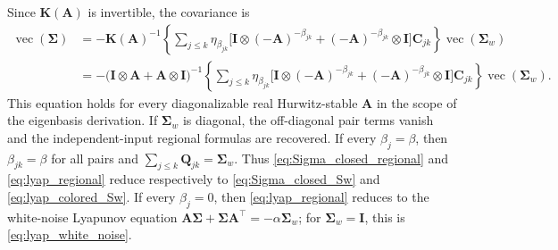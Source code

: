 \documentclass[12pt]{article}
\newcommand{\vc}{\operatorname{vec}}
\begin{document}
Since $\mathbf K(\mathbf A)$ is invertible, the covariance is
\begin{equation}
\boxed{\begin{aligned}
\vc(\boldsymbol\Sigma)
&=-\mathbf K(\mathbf A)^{-1}
\left\{
\sum_{j\leq k}\eta_{\beta_{jk}}
\bigl[\mathbf I\otimes(-\mathbf A)^{-\beta_{jk}}
+(-\mathbf A)^{-\beta_{jk}}\otimes\mathbf I\bigr]\mathbf C_{jk}
\right\}
\vc(\boldsymbol\Sigma_w)\\
&=-\bigl(\mathbf I\otimes\mathbf A
+\mathbf A\otimes\mathbf I\bigr)^{-1}
\left\{
\sum_{j\leq k}\eta_{\beta_{jk}}
\bigl[\mathbf I\otimes(-\mathbf A)^{-\beta_{jk}}
+(-\mathbf A)^{-\beta_{jk}}\otimes\mathbf I\bigr]\mathbf C_{jk}
\right\}
\vc(\boldsymbol\Sigma_w).
\end{aligned}}
\label{eq:vec_regional_solution}
\end{equation}
This equation holds for every diagonalizable real Hurwitz-stable $\mathbf A$ in the scope of the eigenbasis derivation.
If $\boldsymbol\Sigma_w$ is diagonal, the off-diagonal pair terms vanish and the independent-input regional
formulas are recovered. If every $\beta_j=\beta$, then $\beta_{jk}=\beta$ for all pairs and
$\sum_{j\leq k}\mathbf Q_{jk}=\boldsymbol{\Sigma}_w$. Thus
\eqref{eq:Sigma_closed_regional} and \eqref{eq:lyap_regional} reduce respectively to
\eqref{eq:Sigma_closed_Sw} and \eqref{eq:lyap_colored_Sw}. If every $\beta_j=0$, then
\eqref{eq:lyap_regional} reduces to the white-noise Lyapunov equation
$\mathbf A\boldsymbol{\Sigma}+\boldsymbol{\Sigma}\mathbf A^\top=-\alpha\boldsymbol{\Sigma}_w$;
for $\boldsymbol\Sigma_w=\mathbf I$, this is \eqref{eq:lyap_white_noise}.
\end{document}

